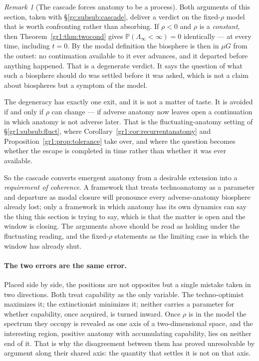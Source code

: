 \documentclass[11pt]{article}
\numberwithin{equation}{section}
\theoremstyle{plain}
\theoremstyle{definition}
\theoremstyle{remark}
\newtheorem{remark}[theorem]{Remark}
\newcommand{\PP}{\mathbb{P}}
\begin{document}
\begin{remark}[The cascade forces anatomy to be a process]
\label{hr:rem:forcesprocess}
Both arguments of this section, taken with
\S\ref{gc:subsub:cascade}, deliver a verdict on the fixed-$\rho$ model
that is worth confronting rather than absorbing. If $\rho<0$ and $\rho$ is a \emph{constant}, then
Theorem~\ref{gr1:thm:twocond} gives
$\PP(\Lambda_\infty<\infty)=0$ identically --- at every time, including
$t=0$. By the modal definition the biosphere is then in $\mu G$ from the
outset: no continuation available to it ever advances, and it departed
before anything happened. That is a degenerate verdict. It says the
question of what such a biosphere should do was settled before it was
asked, which is not a claim about biospheres but a symptom of the
model.

The degeneracy has exactly one exit, and it is not a matter of taste.
It is avoided if and only if $\rho$ can change --- if adverse anatomy
now leaves open a continuation in which anatomy is not adverse later.
That is the fluctuating-anatomy setting of
\S\ref{gr1:subsub:fluct}, where
Corollary~\ref{gr1:cor:recurrentanatomy} and
Proposition~\ref{gr1:prop:tolerance} take over, and where the question
becomes whether the escape is completed in time rather than whether it
was ever available.

So the cascade converts emergent anatomy from a desirable extension
into a \emph{requirement of coherence}. A framework that treats
technoanatomy as a parameter and departure as modal closure will
pronounce every adverse-anatomy biosphere already lost; only a
framework in which anatomy has its own dynamics can say the thing this
section is trying to say, which is that the matter is open and the
window is closing. The arguments above should be read as holding under
the fluctuating reading, and the fixed-$\rho$ statements as the
limiting case in which the window has already shut.
\end{remark}

\paragraph{The two errors are the same error.}\label{hr:rem:sameerror}
Placed side by side, the positions are not opposites but a single
mistake taken in two directions. Both treat capability as the only
variable. The techno-optimist maximizes it; the extinctionist minimizes
it; neither carries a parameter for whether capability, once acquired,
is turned inward. Once $\rho$ is in the model the spectrum they occupy
is revealed as one axis of a two-dimensional space, and the interesting
region, positive anatomy with accumulating capability, lies on
neither end of it. That is why the disagreement between them has proved
unresolvable by argument along their shared axis: the quantity that
settles it is not on that axis.
\end{document}
